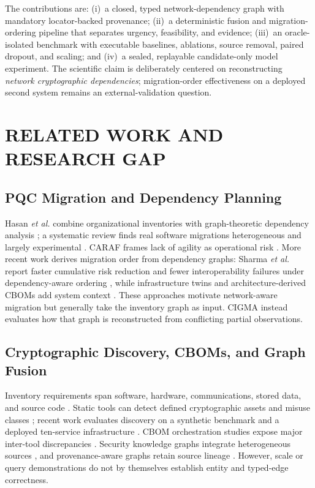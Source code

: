 \documentclass[a4paper,twoside]{article}
\newcommand{\cigma}{CIGMA\xspace}
\begin{document}
The contributions are: (i)~a closed, typed network-dependency graph with mandatory locator-backed provenance; (ii)~a deterministic fusion and migration-ordering pipeline that separates urgency, feasibility, and evidence; (iii)~an oracle-isolated benchmark with executable baselines, ablations, source removal, paired dropout, and scaling; and (iv)~a sealed, replayable candidate-only model experiment. The scientific claim is deliberately centered on reconstructing \emph{network cryptographic dependencies}; migration-order effectiveness on a deployed second system remains an external-validation question.

\section{\uppercase{Related Work and Research Gap}}
\label{sec:related}

\subsection{PQC Migration and Dependency Planning}

Hasan \emph{et al.} combine organizational inventories with graph-theoretic dependency analysis \cite{hasan2024framework}; a systematic review finds real software migrations heterogeneous and largely experimental \cite{nather2024migrating}. CARAF frames lack of agility as operational risk \cite{ma2021caraf}. More recent work derives migration order from dependency graphs: Sharma \emph{et al.} report faster cumulative risk reduction and fewer interoperability failures under dependency-aware ordering \cite{sharma2026dependency}, while infrastructure twins and architecture-derived CBOMs add system context \cite{herzinger2026twin,hess2026anatomy}. These approaches motivate network-aware migration but generally take the inventory graph as input. \cigma instead evaluates how that graph is reconstructed from conflicting partial observations.

\subsection{Cryptographic Discovery, CBOMs, and Graph Fusion}

Inventory requirements span software, hardware, communications, stored data, and source code \cite{schmitt2024criteria}. Static tools can detect defined cryptographic assets and misuse classes \cite{rahaman2019cryptoguard}; recent work evaluates discovery on a synthetic benchmark and a deployed ten-service infrastructure \cite{nather2026hidden}. CBOM orchestration studies expose major inter-tool discrepancies \cite{bogli2026bfcbom}. Security knowledge graphs integrate heterogeneous sources \cite{sikos2023cybersecurity}, and provenance-aware graphs retain source lineage \cite{mitra2021provenance}. However, scale or query demonstrations do not by themselves establish entity and typed-edge correctness.
\end{document}
